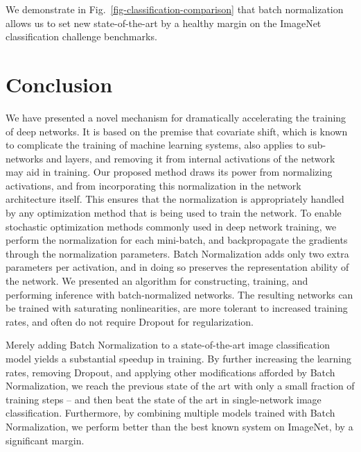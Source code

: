 \documentclass[twocolumn]{article}
\begin{document}
We demonstrate in Fig.~\ref{fig-classification-comparison} that batch
normalization allows us to set new state-of-the-art by a healthy
margin on the ImageNet classification challenge benchmarks.

\section{Conclusion}

We have presented a novel mechanism for dramatically accelerating the
training of deep networks. It is based on the premise that covariate
shift, which is known to complicate the training of machine learning
systems, also applies to sub-networks and layers, and removing it from
internal activations of the network may aid in training. Our proposed
method draws its power from normalizing activations, and from
incorporating this normalization in the network architecture
itself. This ensures that the normalization is appropriately handled
by any optimization method that is being used to train the network. To
enable stochastic optimization methods commonly used in deep network
training, we perform the normalization for each mini-batch, and
backpropagate the gradients through the normalization
parameters. Batch Normalization adds only two extra parameters per
activation, and in doing so preserves the representation ability of
the network. We presented an algorithm for constructing, training, and
performing inference with batch-normalized networks. The resulting
networks can be trained with saturating nonlinearities, are more
tolerant to increased training rates, and often do not require Dropout
for regularization.

Merely adding Batch Normalization to a state-of-the-art image
classification model yields a substantial speedup in training. By
further increasing the learning rates, removing Dropout, and applying
other modifications afforded by Batch Normalization, we reach the
previous state of the art with only a small fraction of training steps
-- and then beat the state of the art in single-network image
classification. Furthermore, by combining multiple models trained with
Batch Normalization, we perform better than the best known system on
ImageNet, by a significant margin.
\end{document}
